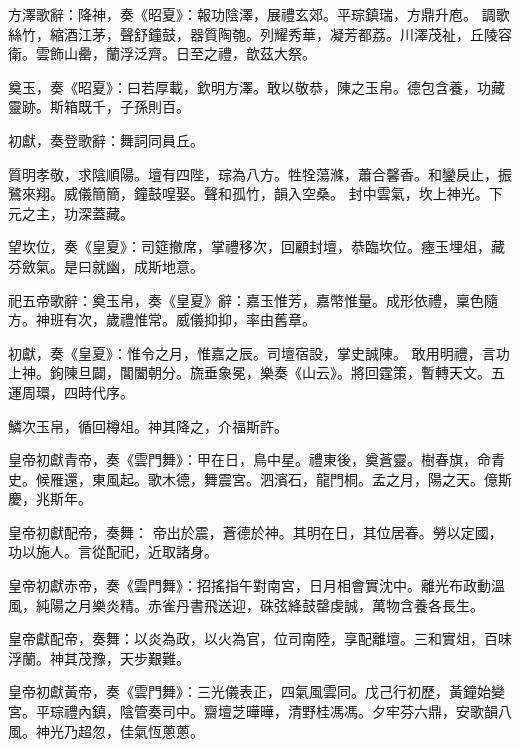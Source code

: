 \begin{pinyinscope}
 方澤歌辭：降神，奏《昭夏》：報功陰澤，展禮玄郊。平琮鎮瑞，方鼎升庖。
 調歌絲竹，縮酒江茅，聲舒鐘鼓，器質陶匏。列耀秀華，凝芳都荔。川澤茂祉，丘陵容衛。雲飾山罍，蘭浮泛齊。日至之禮，歆茲大祭。



 奠玉，奏《昭夏》：曰若厚載，欽明方澤。敢以敬恭，陳之玉帛。德包含養，功藏靈跡。斯箱既千，子孫則百。



 初獻，奏登歌辭：舞詞同員丘。



 質明孝敬，求陰順陽。壇有四陛，琮為八方。牲牷蕩滌，蕭合馨香。和鑾戾止，振鷺來翔。威儀簡簡，鐘鼓喤娶。聲和孤竹，韻入空桑。
 封中雲氣，坎上神光。下元之主，功深蓋藏。



 望坎位，奏《皇夏》：司筵撤席，掌禮移次，回顧封壇，恭臨坎位。瘞玉埋俎，藏芬斂氣。是曰就幽，成斯地意。



 祀五帝歌辭：奠玉帛，奏《皇夏》辭：嘉玉惟芳，嘉幣惟量。成形依禮，稟色隨方。神班有次，歲禮惟常。威儀抑抑，率由舊章。



 初獻，奏《皇夏》：惟令之月，惟嘉之辰。司壇宿設，掌史誠陳。
 敢用明禮，言功上神。鉤陳旦闢，閶闔朝分。旒垂象冕，樂奏《山云》。將回霆策，暫轉天文。五運周環，四時代序。



 鱗次玉帛，循回樽俎。神其降之，介福斯許。



 皇帝初獻青帝，奏《雲門舞》：甲在日，鳥中星。禮東後，奠蒼靈。樹春旗，命青史。候雁還，東風起。歌木德，舞震宮。泗濱石，龍門桐。孟之月，陽之天。億斯慶，兆斯年。



 皇帝初獻配帝，奏舞：
 帝出於震，蒼德於神。其明在日，其位居春。勞以定國，功以施人。言從配祀，近取諸身。



 皇帝初獻赤帝，奏《雲門舞》：招搖指午對南宮，日月相會實沈中。離光布政動溫風，純陽之月樂炎精。赤雀丹書飛送迎，硃弦絳鼓罄虔誠，萬物含養各長生。



 皇帝獻配帝，奏舞：以炎為政，以火為官，位司南陸，享配離壇。三和實俎，百味浮蘭。神其茂豫，天步艱難。



 皇帝初獻黃帝，奏《雲門舞》：三光儀表正，四氣風雲同。戊己行初歷，黃鐘始變宮。平琮禮內鎮，陰管奏司中。齋壇芝曄曄，清野桂馮馮。夕牢芬六鼎，安歌韻八風。神光乃超忽，佳氣恆蔥蔥。




\end{pinyinscope}
